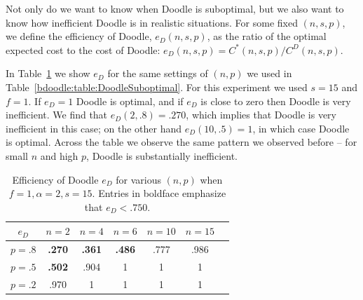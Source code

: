Not only do we want to know when Doodle is suboptimal, but we also want to know how inefficient Doodle is in realistic situations. For some fixed $(n, s, p)$, we define the efficiency of Doodle, $e_{D}(n,s,p)$, as the ratio of the optimal expected cost to the cost of Doodle: $e_{D}(n,s,p) = C^*(n, s, p) / C^D(n, s, p)$.

In Table~\ref{bdoodle:table:DoodleEfficiency} we show $e_{D}$ for the same settings of $(n, p)$ we used in Table~\ref{bdoodle:table:DoodleSuboptimal}. For this experiment we used $s = 15$ and $f = 1$. If $e_{D} = 1$ Doodle is optimal, and if $e_{D}$ is close to zero then Doodle is very inefficient. We find that $e_{D}(2, .8) = .270$, which implies that Doodle is very inefficient in this case; on the other hand $e_{D}(10, .5) = 1$, in which case Doodle is optimal. Across the table we observe the same pattern we observed before -- for small $n$ and high $p$, Doodle is substantially inefficient.
\begin{table}[h]  %
\centering
\begin{tabular}{|c|c|c|c|c|c|c|}
	\hline
	$e_{D}$ & $n = 2$ & $n = 4$ & $n = 6$ & $ n = 10 $ & $n = 15$ \\ \hline
	$p = .8$ & \textbf{.270} & \textbf{.361} & \textbf{.486} & .777 & .986 \\ \hline
	$p = .5$ & \textbf{.502} & .904 & 1 & 1 & 1  \\ \hline
	$p = .2$ & .970 & 1 & 1 & 1 & 1\\ \hline
\end{tabular}
\caption{Efficiency of Doodle $e_{D}$ for various $(n, p)$ when $f = 1, \alpha=2, s = 15$.
Entries in boldface emphasize that $e_{D} < .750$.
} \label{bdoodle:table:DoodleEfficiency}
\end{table}

